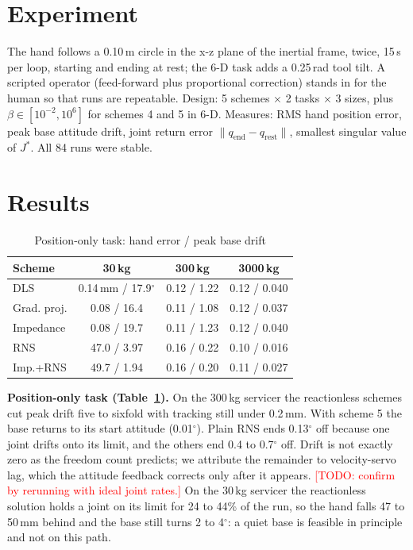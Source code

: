 \documentclass[conference]{IEEEtran}
\newcommand{\todo}[1]{\textcolor{red}{[TODO: #1]}}
\begin{document}
\section{Experiment}
The hand follows a 0.10\,m circle in the x-z plane of the inertial frame, twice, 15\,s per loop, starting and
ending at rest; the 6-D task adds a 0.25\,rad tool tilt. A scripted operator (feed-forward plus
proportional correction) stands in for the human so that runs are repeatable. Design: 5 schemes
$\times$ 2 tasks $\times$ 3 sizes, plus $\beta\in[10^{-2},10^{6}]$ for schemes 4 and 5 in 6-D.
Measures: RMS hand position error, peak base attitude drift, joint return error
$\|q_{\mathrm{end}}-q_{\mathrm{rest}}\|$, smallest singular value of $J^{*}$. All 84 runs were stable.

\section{Results}
\begin{table}[t]
\caption{Position-only task: hand error / peak base drift}\label{tab:3d}
\centering\begin{tabular}{lccc}\toprule
Scheme & 30\,kg & 300\,kg & 3000\,kg\\\midrule
DLS & 0.14\,mm / 17.9$^\circ$ & 0.12 / 1.22 & 0.12 / 0.040\\
Grad. proj. & 0.08 / 16.4 & 0.11 / 1.08 & 0.12 / 0.037\\
Impedance & 0.08 / 19.7 & 0.11 / 1.23 & 0.12 / 0.040\\
RNS & 47.0 / 3.97 & 0.16 / 0.22 & 0.10 / 0.016\\
Imp.+RNS & 49.7 / 1.94 & 0.16 / 0.20 & 0.11 / 0.027\\\bottomrule
\end{tabular}\end{table}

\textbf{Position-only task (Table~\ref{tab:3d}).} On the 300\,kg servicer the reactionless schemes
cut peak drift five to sixfold with tracking still under 0.2\,mm. With scheme 5 the base returns to its start
attitude (0.01$^\circ$). Plain RNS ends 0.13$^\circ$ off because one joint drifts onto its limit, and the others end 0.4 to 0.7$^\circ$ off. Drift is not exactly
zero as the freedom count predicts; we attribute the remainder to velocity-servo lag, which the
attitude feedback corrects only after it appears. \todo{confirm by rerunning with ideal joint
rates.} On the 30\,kg servicer the reactionless solution holds a joint on its limit for 24 to 44\% of the run,
so the hand falls 47 to 50\,mm behind and the base still turns 2 to 4$^\circ$: a quiet base is feasible in principle and not on this path.
\end{document}
